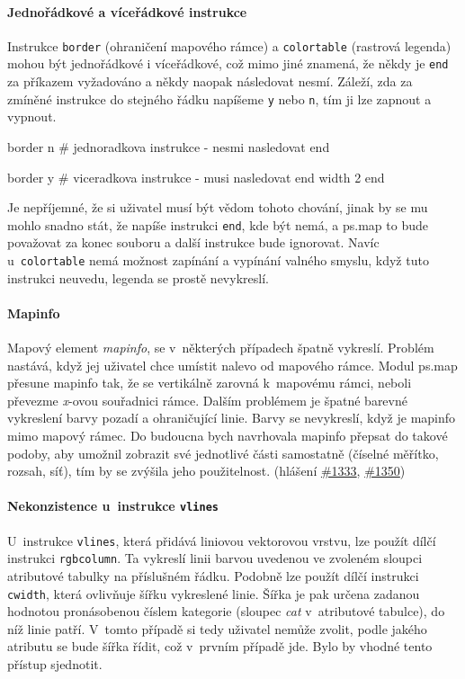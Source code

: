 \documentclass[a4paper,12pt,draft]{article}
\newcommand{\instr}[1]{\lstinline[style=psmapInline]|#1|}
\begin{document}
\paragraph*{Jednořádkové a víceřádkové instrukce}
\label{sec:psmap:singleline}
Instrukce \instr{border} (ohraničení mapo\-vého rámce) a \instr{colortable}
(rastrová legenda) mohou být jednořádkové i víceřádkové, což mimo
jiné znamená, že někdy je \instr{end} za příkazem vyžadováno a někdy
naopak následovat nesmí. Záleží, zda za zmíněné instrukce do stejného
řádku napíšeme \instr{y} nebo \instr{n}, tím ji lze zapnout a vypnout.
\begin{psmap}
border n    # jednoradkova instrukce - nesmi nasledovat end

border y    # viceradkova instrukce - musi nasledovat end
   width 2
end
\end{psmap}
Je nepříjemné, že si uživatel musí být vědom tohoto chování,
jinak by se mu mohlo snadno stát, že napíše instrukci \instr{end}, kde
být nemá, a ps.map to bude považovat za konec souboru a další
instrukce bude ignorovat.
Navíc u~\instr{colortable} nemá možnost zapínání a vypínání valného
smyslu, když tuto instrukci neuvedu, legenda se prostě nevykreslí.


\paragraph*{Mapinfo}
\label{sec:psmap:mapinfo}
Mapový element \emph{mapinfo}, se v~některých případech špatně
vykreslí. Problém nastává, když jej uživatel chce umístit nalevo
od mapového rámce. Modul ps.map přesune mapinfo tak, že se
vertikálně zarovná k~mapovému rámci, neboli převezme \emph{x}-ovou
souřadnici rámce. Dalším problémem je špatné barevné vykreslení barvy
pozadí a ohraničující linie. Barvy se nevykreslí, když je mapinfo
mimo mapový rámec.
Do budoucna bych navrhovala mapinfo přepsat do takové podoby, aby umožnil
zobrazit své jednotlivé části samostatně (číselné měřítko, rozsah, síť), tím
by se zvýšila jeho použitelnost.
(hlášení \href{https://trac.osgeo.org/grass/ticket/1333}{\#1333},
\href{https://trac.osgeo.org/grass/ticket/1350}{\#1350})


\paragraph*{Nekonzistence u~instrukce \instr{vlines}}
\label{sec:psmap:vlines}
U~instrukce \instr{vlines}, která přidává liniovou vektorovou vrstvu,
lze použít dílčí instrukci \instr{rgbcolumn}. Ta vykreslí   linii
barvou uvedenou ve zvoleném sloupci atributové tabulky na příslušném
řádku. Podobně lze použít dílčí instrukci \instr{cwidth}, která
ovlivňuje šířku vykreslené linie. Šířka je pak určena zadanou hodnotou
pronásobenou číslem kategorie (sloupec \emph{cat} v~atributové tabulce),
do níž linie patří. V~tomto případě si tedy uživatel nemůže zvolit,
podle jakého atributu se bude šířka řídit, což v~prvním případě
jde. Bylo by vhodné tento přístup sjednotit.
\end{document}
